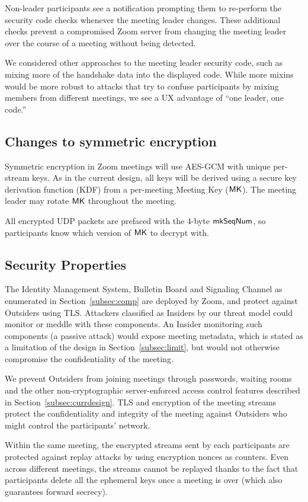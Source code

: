 Non-leader participants see a notification prompting them to re-perform the security code checks
whenever the meeting leader changes. These additional checks prevent a compromised Zoom server from
changing the meeting leader over the course of a meeting without being detected.

We considered other approaches to the meeting leader security code, such as mixing more of the handshake data into the displayed code. While more mixins would be more robust to attacks that try to confuse participants by mixing members from different meetings, we see a UX advantage of ``one leader, one code.''

\subsection{Changes to symmetric encryption}
Symmetric encryption in Zoom meetings will use AES-GCM with unique per-stream keys. As in the current design, all keys will be derived using a secure key derivation function (KDF) from a per-meeting Meeting Key (${\sf MK}$). The meeting leader may rotate ${\sf MK}$ throughout the meeting.

All encrypted UDP packets are prefaced with the 4-byte $\mathsf{mkSeqNum}$, so participants know which version of ${\sf MK}$ to decrypt with.

\subsection{Security Properties}
\label{subsec:secprop}
The Identity Management System, Bulletin Board and Signaling Channel as enumerated in
Section~\ref{subsec:comp} are deployed by Zoom, and protect against Outsiders using TLS. Attackers
classified as Insiders by our threat model could monitor or meddle with these components. An Insider
monitoring such components (a passive attack) would expose meeting metadata, which is stated as a
limitation of the design in Section~\ref{subsec:limit}, but would not otherwise compromise the
confidentiality of the meeting.

We prevent Outsiders from joining meetings through passwords, waiting rooms and the other
non-cryptographic server-enforced access control features described in
Section~\ref{subsec:currdesign}. TLS and encryption of the meeting streams protect the
confidentiality and integrity of the meeting against Outsiders who might control the participants'
network.

Within the same meeting, the encrypted streams sent by each participants are protected against
replay attacks by using encryption nonces as counters. Even across different meetings, the streams
cannot be replayed thanks to the fact that participants delete all the ephemeral keys once a meeting
is over (which also guarantees forward secrecy). 

